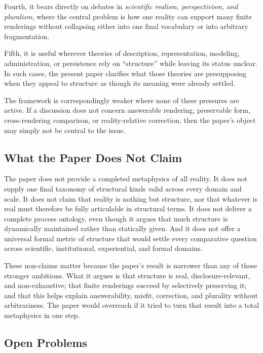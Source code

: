 \documentclass[11pt]{article}
\renewcommand{\emph}[1]{\textit{#1}}
\begin{document}
Fourth, it bears directly on debates in \emph{scientific realism, perspectivism, and pluralism}, where the central problem is how one reality can support many finite renderings without collapsing either into one final vocabulary or into arbitrary fragmentation.

Fifth, it is useful wherever theories of description, representation, modeling, administration, or persistence rely on ``structure'' while leaving its status unclear. In such cases, the present paper clarifies what those theories are presupposing when they appeal to structure as though its meaning were already settled.

The framework is correspondingly weaker where none of these pressures are active. If a discussion does not concern answerable rendering, preservable form, cross-rendering comparison, or reality-relative correction, then the paper's object may simply not be central to the issue.

\subsection{What the Paper Does Not Claim}

The paper does not provide a completed metaphysics of all reality. It does not supply one final taxonomy of structural kinds valid across every domain and scale. It does not claim that reality is nothing but structure, nor that whatever is real must therefore be fully articulable in structural terms. It does not deliver a complete process ontology, even though it argues that much structure is dynamically maintained rather than statically given. And it does not offer a universal formal metric of structure that would settle every comparative question across scientific, institutional, experiential, and formal domains.

These non-claims matter because the paper's result is narrower than any of those stronger ambitions. What it argues is that structure is real, disclosure-relevant, and non-exhaustive; that finite renderings succeed by selectively preserving it; and that this helps explain answerability, misfit, correction, and plurality without arbitrariness. The paper would overreach if it tried to turn that result into a total metaphysics in one step.

\subsection{Open Problems}
\end{document}
